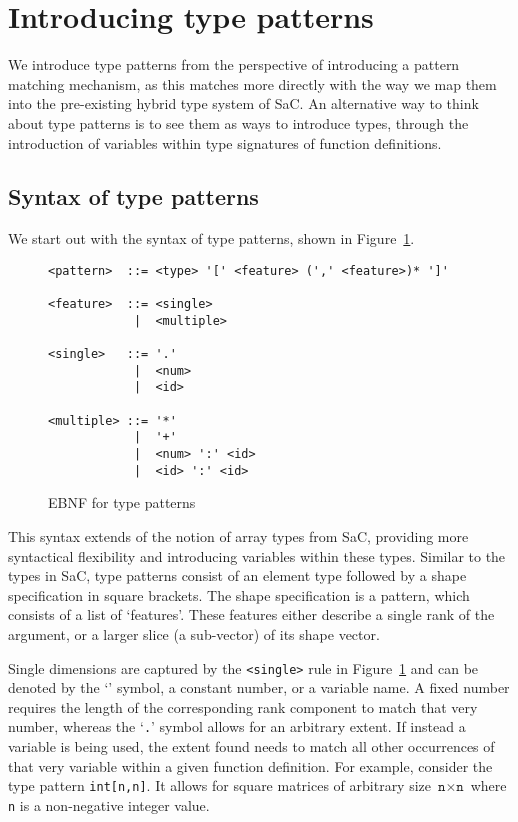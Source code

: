 
\section{Introducing type patterns}

We introduce type patterns from the perspective of introducing a pattern matching mechanism, as this matches more directly with the way we map them into the pre-existing hybrid type system of SaC.
An alternative way to think about type patterns is to see them as ways to introduce types, through the introduction of variables within type signatures of function definitions.

\subsection{Syntax of type patterns}

We start out with the syntax of type patterns, shown in Figure~\ref{fig:syntax}.

\begin{figure}[hbt]
\begin{verbatim}
<pattern>  ::= <type> '[' <feature> (',' <feature>)* ']'

<feature>  ::= <single>
            |  <multiple>

<single>   ::= '.'
            |  <num>
            |  <id>

<multiple> ::= '*'
            |  '+'
            |  <num> ':' <id>
            |  <id> ':' <id>
\end{verbatim}
\caption{EBNF for type patterns}
\label{fig:syntax}
\end{figure}

\noindent
This syntax extends of the notion of array types from SaC, providing more syntactical flexibility and introducing variables within these types.
Similar to the types in SaC, type patterns consist of an element type followed by a shape specification in square brackets.
The shape specification is a pattern, which consists of a list of `features'.
These features either describe a single rank of the argument, or a larger slice (a sub-vector) of its shape vector.

Single dimensions are captured by the \verb|<single>| rule in Figure~\ref{fig:syntax} and can be denoted by the `\tpdot{}' symbol, a constant number, or a variable name. 
A fixed number requires the length of the corresponding rank component to match that very number, whereas the `\texttt{.}' symbol allows for an arbitrary extent.
If instead a variable is being used, the extent found needs to match all other occurrences of that very variable within a given function definition.
For example, consider the type pattern \texttt{int[n,n]}.
It allows for square matrices of arbitrary size $\texttt{n} \times \texttt{n}$ where \texttt{n} is a non-negative integer value.

